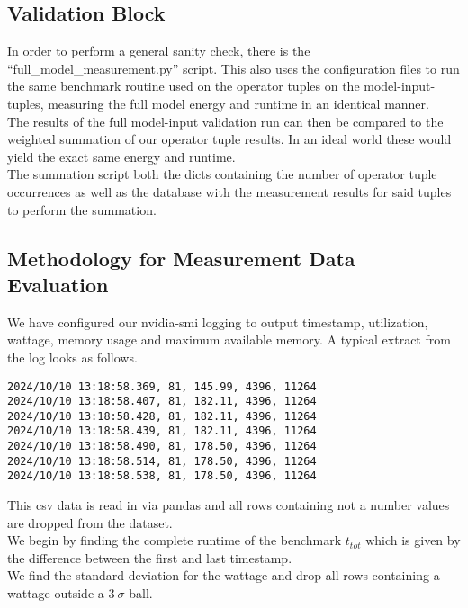 \documentclass[conference]{IEEEtran}
\begin{document}
\subsection{Validation Block}
In order to perform a general sanity check, there is the “full\_model\_measurement.py” script. This also uses the configuration files to run the same benchmark routine used on the operator tuples on the model-input-tuples, measuring the full model energy and runtime in an identical manner. \\
The results of the full model-input validation run can then be compared to the weighted summation of our operator tuple results. In an ideal world these would yield the exact same energy and runtime. \\
The summation script both the dicts containing the number of operator tuple occurrences as well as the database with the measurement results for said tuples to perform the summation.

\subsection{Methodology for Measurement Data Evaluation}

We have configured our nvidia-smi logging to output timestamp, utilization, wattage, memory usage and maximum available memory. A typical extract from the log looks as follows.


\begin{footnotesize} %
\begin{verbatim}
2024/10/10 13:18:58.369, 81, 145.99, 4396, 11264
2024/10/10 13:18:58.407, 81, 182.11, 4396, 11264
2024/10/10 13:18:58.428, 81, 182.11, 4396, 11264
2024/10/10 13:18:58.439, 81, 182.11, 4396, 11264
2024/10/10 13:18:58.490, 81, 178.50, 4396, 11264
2024/10/10 13:18:58.514, 81, 178.50, 4396, 11264
2024/10/10 13:18:58.538, 81, 178.50, 4396, 11264
\end{verbatim}
\end{footnotesize}

This csv data is read in via pandas and all rows containing not a number values are dropped from the dataset. \\
We begin by finding the complete runtime of the benchmark $t_{tot}$ which is given by the difference between the first and last timestamp. \\
We find the standard deviation for the wattage and drop all rows containing a wattage outside a $3 \: \sigma $ ball.
\end{document}
